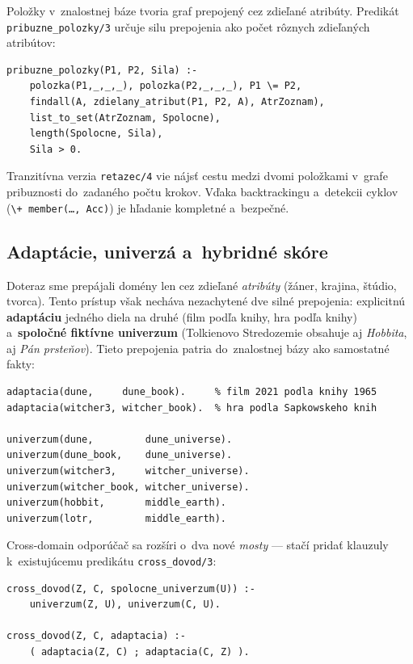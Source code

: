 \documentclass[11pt,a4paper]{article}
\begin{document}
Položky v~znalostnej báze tvoria graf prepojený cez zdieľané
atribúty. Predikát \texttt{pribuzne\_polozky/3} určuje silu
prepojenia ako počet rôznych zdieľaných atribútov:

\begin{lstlisting}
pribuzne_polozky(P1, P2, Sila) :-
    polozka(P1,_,_,_), polozka(P2,_,_,_), P1 \= P2,
    findall(A, zdielany_atribut(P1, P2, A), AtrZoznam),
    list_to_set(AtrZoznam, Spolocne),
    length(Spolocne, Sila),
    Sila > 0.
\end{lstlisting}

\noindent
Tranzitívna verzia \texttt{retazec/4} vie nájsť cestu medzi
dvomi položkami v~grafe pribuznosti do~zadaného počtu krokov.
Vďaka backtrackingu a~detekcii cyklov (\texttt{\textbackslash+
member(\dots, Acc)}) je hľadanie kompletné a~bezpečné.

\subsection{Adaptácie, univerzá a~hybridné skóre}
\label{sec:hybrid}

Doteraz sme prepájali domény len cez zdieľané \emph{atribúty}
(žáner, krajina, štúdio, tvorca). Tento prístup však necháva
nezachytené dve silné prepojenia: explicitnú \textbf{adaptáciu}
jedného diela na druhé (film podľa knihy, hra podľa knihy)
a~\textbf{spoločné fiktívne univerzum} (Tolkienovo Stredozemie
obsahuje aj \emph{Hobbita}, aj \emph{Pán prsteňov}). Tieto
prepojenia patria do~znalostnej bázy ako samostatné fakty:

\begin{lstlisting}[caption={Adaptácie a~univerzá}]
adaptacia(dune,     dune_book).     % film 2021 podla knihy 1965
adaptacia(witcher3, witcher_book).  % hra podla Sapkowskeho knih

univerzum(dune,         dune_universe).
univerzum(dune_book,    dune_universe).
univerzum(witcher3,     witcher_universe).
univerzum(witcher_book, witcher_universe).
univerzum(hobbit,       middle_earth).
univerzum(lotr,         middle_earth).
\end{lstlisting}

\noindent
Cross-domain odporúčač sa rozšíri o~dva nové \emph{mosty} ---
stačí pridať klauzuly k~existujúcemu predikátu \texttt{cross\_dovod/3}:

\begin{lstlisting}
cross_dovod(Z, C, spolocne_univerzum(U)) :-
    univerzum(Z, U), univerzum(C, U).

cross_dovod(Z, C, adaptacia) :-
    ( adaptacia(Z, C) ; adaptacia(C, Z) ).
\end{lstlisting}
\end{document}
